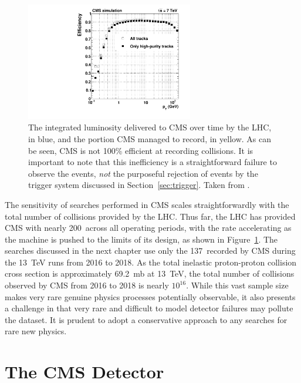     \begin{figure}[h!]
    \centering
    \includegraphics[width=0.65\textwidth]{figures/efficiencyVsPt.pdf}
    \caption[CMS integrated luminosity delivered and recorded over time.]{
      The integrated luminosity delivered to CMS over time by the LHC, in blue, and the portion CMS managed to record, in yellow.
      As can be seen, CMS is not 100\% efficient at recording collisions. 
      It is important to note that this inefficiency is a straightforward failure to observe the events, {\it not} the purposeful rejection of events by the trigger system discussed in Section~\ref{sec:trigger}.
      Taken from \cite{lumipublic}.}
    \label{fig:intlumi}
  \end{figure}  


  The sensitivity of searches performed in CMS scales straightforwardly with the total number of collisions provided by the LHC.
  Thus far, the LHC has provided CMS with nearly 200~\fbinv across all operating periods, with the rate accelerating as the machine is pushed to the limits of its design, as shown in Figure~\ref{fig:intlumi}.
  The searches discussed in the next chapter use only the 137~\fbinv recorded by CMS during the 13~TeV runs from 2016 to 2018.
  As the total inelastic proton-proton collision cross section is approximately 69.2~mb at 13~TeV, the total number of collisions observed by CMS from 2016 to 2018 is nearly $10^{16}$.
  While this vast sample size makes very rare genuine physics processes potentially observable, it also presents a challenge in that very rare and difficult to model detector failures may pollute the dataset.
  It is prudent to adopt a conservative approach to any searches for rare new physics.

\section{The CMS Detector} \label{sec:CMS}


